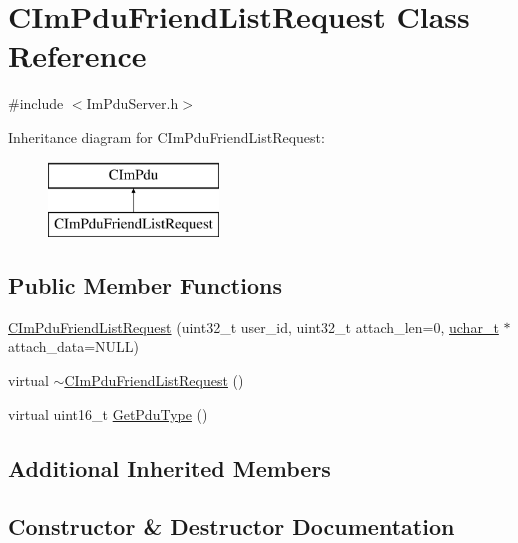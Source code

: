 \hypertarget{class_c_im_pdu_friend_list_request}{}\section{C\+Im\+Pdu\+Friend\+List\+Request Class Reference}
\label{class_c_im_pdu_friend_list_request}


{\ttfamily \#include $<$Im\+Pdu\+Server.\+h$>$}

Inheritance diagram for C\+Im\+Pdu\+Friend\+List\+Request\+:\begin{figure}[H]
\begin{center}
\leavevmode
\includegraphics[height=2.000000cm]{class_c_im_pdu_friend_list_request}
\end{center}
\end{figure}
\subsection*{Public Member Functions}
\begin{DoxyCompactItemize}
\item 
\hyperlink{class_c_im_pdu_friend_list_request_a4deea58494473a41b7170c43e882b4ea}{C\+Im\+Pdu\+Friend\+List\+Request} (uint32\+\_\+t user\+\_\+id, uint32\+\_\+t attach\+\_\+len=0, \hyperlink{base_2ostype_8h_a124ea0f8f4a23a0a286b5582137f0b8d}{uchar\+\_\+t} $\ast$attach\+\_\+data=N\+U\+L\+L)
\item 
virtual \hyperlink{class_c_im_pdu_friend_list_request_a466d799fe6ff19369a368a680ee08d73}{$\sim$\+C\+Im\+Pdu\+Friend\+List\+Request} ()
\item 
virtual uint16\+\_\+t \hyperlink{class_c_im_pdu_friend_list_request_ac9ed875be786017e1abd1a2b8c46bf3d}{Get\+Pdu\+Type} ()
\end{DoxyCompactItemize}
\subsection*{Additional Inherited Members}


\subsection{Constructor \& Destructor Documentation}
\hypertarget{class_c_im_pdu_friend_list_request_a4deea58494473a41b7170c43e882b4ea}{}
